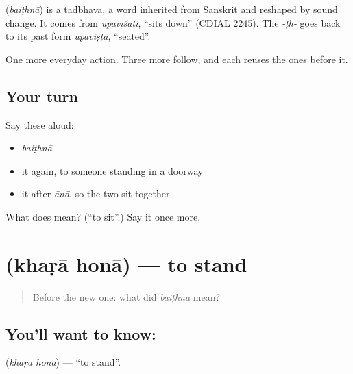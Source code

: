 \begin{cousinweb}
\textbf{} (\emph{baiṭhnā}) is a tadbhava, a word inherited from Sanskrit and reshaped by sound change. It comes from \emph{upaviśati}, \textquotedblleft{}sits down\textquotedblright{} (CDIAL 2245). The \emph{-ṭh-} goes back to its past form \emph{upaviṣṭa}, \textquotedblleft{}seated\textquotedblright{}.
\end{cousinweb}

\begin{grammarlens}[title={What you've built}]
One more everyday action. Three more follow, and each reuses the ones before it.
\end{grammarlens}

\subsection*{Your turn}
Say these aloud:

\begin{itemize}
\raggedright
  \item \emph{baiṭhnā}
  \item it again, to someone standing in a doorway
  \item it after \emph{ānā}, so the two sit together
\end{itemize}

\begin{tcolorbox}[breakable,colback=teal!4,colframe=teal!35!black,title={Before you move on}]
What does  mean? (\textquotedblleft{}to sit\textquotedblright{}.) Say it once more.
\end{tcolorbox}
\section[\texorpdfstring{\hi{खड़ा} \hi{होना} (khaṛā honā)}{खड़ा होना (khaṛā honā)}]{  (khaṛā honā) — to stand}

\label{lesson:HI-C42-stand}



\begin{quote}
Before the new one: what did \emph{baiṭhnā} mean?
\end{quote}

\subsection*{You'll want to know:  }
\textbf{ } (\emph{khaṛā honā}) — \textquotedblleft{}to stand\textquotedblright{}.

